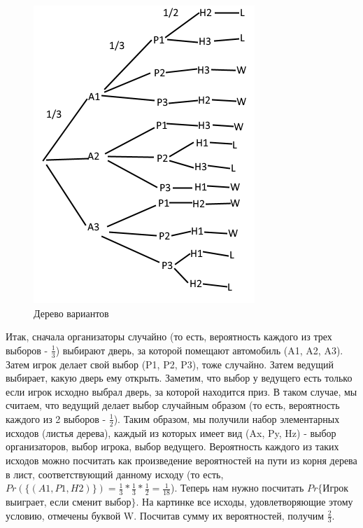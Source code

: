 \begin{figure}
\includegraphics[width=\linewidth]{MontyHall.png}
\caption{Дерево вариантов}
\label{fig:MontyHall}
\end{figure}
Итак, сначала организаторы случайно (то есть, вероятность каждого из трех выборов - $\frac{1}{3}$) выбирают дверь, за которой помещают автомобиль (A1, A2, A3). Затем игрок делает свой выбор (P1, P2, P3), тоже случайно. Затем ведущий выбирает, какую дверь ему открыть. Заметим, что выбор у ведущего есть только если игрок исходно выбрал дверь, за которой находится приз. В таком случае, мы считаем, что ведущий делает выбор случайным образом (то есть, вероятность каждого из 2 выборов - $\frac{1}{2}$). Таким образом, мы получили набор элементарных исходов (листья дерева), каждый из которых имеет вид (Ax, Py, Hz) - выбор организаторов, выбор игрока, выбор ведущего. Вероятность каждого из таких исходов можно посчитать как произведение вероятностей на пути из корня дерева в лист, соответствующий данному исходу (то есть, $Pr(\{(A1, P1, H2)\}) = \frac{1}{3} * \frac{1}{3} * \frac{1}{2} = \frac{1}{18}$). Теперь нам нужно посчитать $Pr\{$Игрок выиграет, если сменит выбор$\}$. На картинке все исходы, удовлетворяющие этому условию, отмечены буквой W. Посчитав сумму их вероятностей, получим $\frac{2}{3}$.\\
